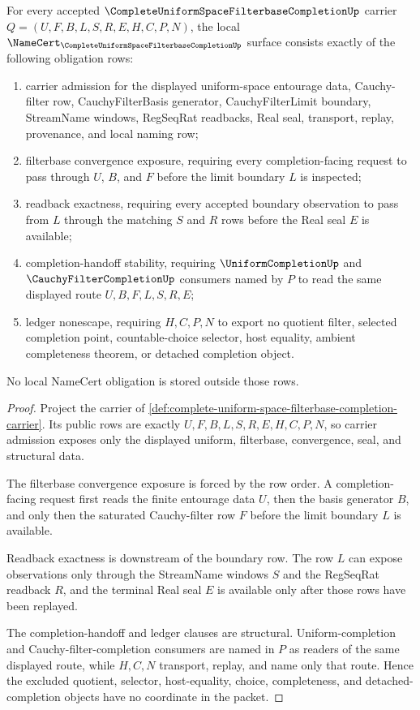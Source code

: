 \begin{theorem}
\label{thm:complete-uniform-space-filterbase-convergence-obligations}
For every accepted $\CompleteUniformSpaceFilterbaseCompletionUp$ carrier $Q=(U,F,B,L,S,R,E,H,C,P,N)$, the local $\NameCert_{\CompleteUniformSpaceFilterbaseCompletionUp}$ surface consists exactly of the following obligation rows:
\begin{enumerate}
\item carrier admission for the displayed uniform-space entourage data, Cauchy-filter row, CauchyFilterBasis generator, CauchyFilterLimit boundary, StreamName windows, RegSeqRat readbacks, Real seal, transport, replay, provenance, and local naming row;
\item filterbase convergence exposure, requiring every completion-facing request to pass through $U$, $B$, and $F$ before the limit boundary $L$ is inspected;
\item readback exactness, requiring every accepted boundary observation to pass from $L$ through the matching $S$ and $R$ rows before the Real seal $E$ is available;
\item completion-handoff stability, requiring $\UniformCompletionUp$ and $\CauchyFilterCompletionUp$ consumers named by $P$ to read the same displayed route $U,B,F,L,S,R,E$;
\item ledger nonescape, requiring $H,C,P,N$ to export no quotient filter, selected completion point, countable-choice selector, host equality, ambient completeness theorem, or detached completion object.
\end{enumerate}
No local NameCert obligation is stored outside those rows.
\end{theorem}
\begin{proof}
Project the carrier of \autoref{def:complete-uniform-space-filterbase-completion-carrier}. Its public rows are exactly $U,F,B,L,S,R,E,H,C,P,N$, so carrier admission exposes only the displayed uniform, filterbase, convergence, seal, and structural data.

The filterbase convergence exposure is forced by the row order. A completion-facing request first reads the finite entourage data $U$, then the basis generator $B$, and only then the saturated Cauchy-filter row $F$ before the limit boundary $L$ is available.

Readback exactness is downstream of the boundary row. The row $L$ can expose observations only through the StreamName windows $S$ and the RegSeqRat readback $R$, and the terminal Real seal $E$ is available only after those rows have been replayed.

The completion-handoff and ledger clauses are structural. Uniform-completion and Cauchy-filter-completion consumers are named in $P$ as readers of the same displayed route, while $H,C,N$ transport, replay, and name only that route. Hence the excluded quotient, selector, host-equality, choice, completeness, and detached-completion objects have no coordinate in the packet.
\end{proof}

